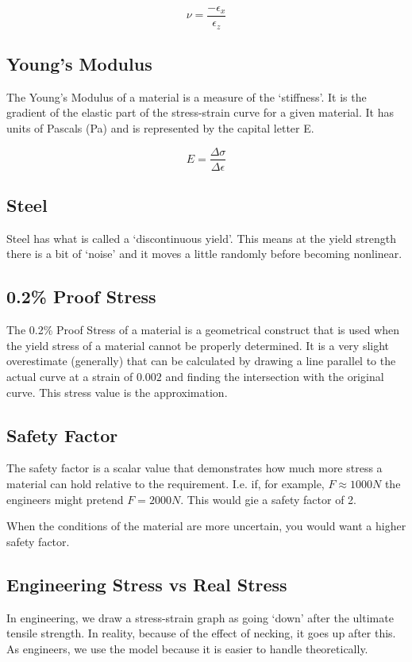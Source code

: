 \documentclass[12pt]{article}
\begin{document}
\begin{equation*}
\nu = \frac{-\epsilon_x}{\epsilon_z}
\end{equation*}

\subsection{Young's Modulus}
The Young's Modulus of a material is a measure of the `stiffness'. 
It is the gradient of the elastic part of the stress-strain curve for a given material.
It has units of Pascals (Pa) and is represented by the capital letter E. 

\begin{equation*}
  E = \frac{\Delta \sigma}{\Delta \epsilon} 
\end{equation*}
\subsection{Steel}
Steel has what is called a `discontinuous yield'.  
This means at the yield strength there is a bit of `noise' and it moves a little randomly before becoming nonlinear. 

\subsection{0.2\% Proof Stress}
The 0.2\% Proof Stress of a material is a geometrical construct that is used when the yield stress of a material cannot be properly determined. 
It is a very slight overestimate (generally) that can be calculated by drawing a line parallel to the actual curve at a strain of $0.002$ and finding the intersection with the original curve.
This stress value is the approximation. 

\subsection{Safety Factor}
The safety factor is a scalar value that demonstrates how much more stress a material can hold relative to the requirement. 
I.e. if, for example, $F \approx 1000\unit{N}$ the engineers might pretend $F = 2000N$. 
This would gie a safety factor of 2.

When the conditions of the material are more uncertain, you would want a higher safety factor.

\subsection{Engineering Stress vs Real Stress}
In engineering, we draw a stress-strain graph as going `down' after the ultimate tensile strength.
In reality, because of the effect of necking, it goes up after this.
As engineers, we use the model because it is easier to handle theoretically.
\end{document}
